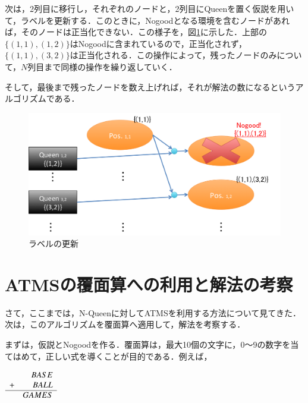 \documentclass{jarticle}
\begin{document}
次は，2列目に移行し，それぞれのノードと，2列目にQueenを置く仮説を用いて，ラベルを更新する．このときに，Nogoodとなる環境を含むノードがあれば，そのノードは正当化できない．この様子を，図\ref{fig:repetition}に示した．上部の$\{(1,1),(1,2)\}$はNogoodに含まれているので，正当化されず，$\{(1,1),(3,2)\}$は正当化される．この操作によって，残ったノードのみについて，$N$列目まで同様の操作を繰り返していく．

そして，最後まで残ったノードを数え上げれば，それが解法の数になるというアルゴリズムである．

\begin{figure}[H]
	\begin{center}
	\includegraphics[width=140mm]{image/repetition.png}
	\caption{ラベルの更新}
	\label{fig:repetition}
	\end{center}
\end{figure}





\section{ATMSの覆面算への利用と解法の考察}
さて，ここまでは，N-Queenに対してATMSを利用する方法について見てきた．次は，このアルゴリズムを覆面算へ適用して，解法を考察する．

まずは，仮説とNogoodを作る．覆面算は，最大10個の文字に，$0〜9$の数字を当てはめて，正しい式を導くことが目的である．例えば，

\begin{center}
{\Large{
$
\begin{array}{rr}
  &  BASE\\
+ &  BALL \\ \hline
     & GAMES
\end{array}
$
}} \\
\end{center}
\end{document}
